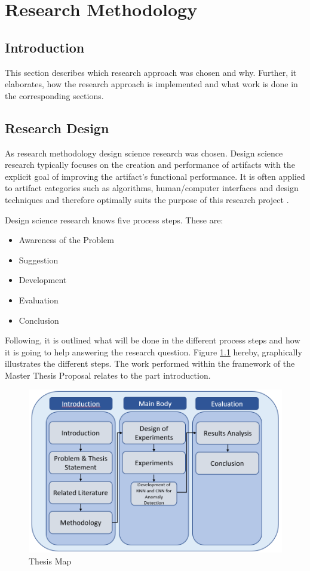 
\chapter{Research Methodology} %

\section{Introduction}
This section describes which research approach was chosen and why. Further, it elaborates, how the research approach is implemented and what work is done in the corresponding sections. 

\section{Research Design}
As research methodology design science research was chosen. Design science research typically focuses on the creation and performance of artifacts with the explicit goal of improving the artifact's functional performance. It is often applied to artifact categories such as algorithms, human/computer interfaces and design techniques and therefore optimally suits the purpose of this research project \parencite{Hevner2010}.

Design science research knows five process steps. These are:

\begin{itemize}
	\item Awareness of the Problem
	\item Suggestion
	\item Development
	\item Evaluation
	\item Conclusion
\end{itemize}

Following, it is outlined what will be done in the different process steps and how it is going to help answering the research question. Figure \ref{Thesis Map} hereby, graphically illustrates the different steps. The work performed within the framework of the Master Thesis Proposal relates to the part introduction. 

\begin{figure}[h]
	\centering
	\includegraphics[scale=0.5]{Figures/Thesis Map}
	\decoRule
	\caption[Thesis Map]{Thesis Map \parencite{own}}
	\label{Thesis Map}
\end{figure}

